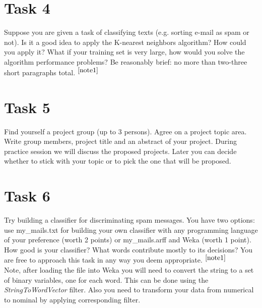 \documentclass{article}
\newcommand{\footref}[1]{%
    $^{\ref{#1}}$%
}
\begin{document}
\section*{Task 4}
Suppose you are given a task of classifying texts (e.g. sorting e-mail as spam or not). Is it a good idea to apply the K-nearest neighbors algorithm? How could you apply it? What if your training set is very large, how would you solve the algorithm performance problems?
Be reasonably brief: no more than two-three short paragraphs total.\footref{note1}

\section*{Task 5}
Find yourself a project group (up to 3 persons). Agree on a project topic area. Write group members, project title and an abstract of your project. During practice session we will discuss the proposed projects. Later you can decide whether to stick with your topic or to pick the one that will be proposed. 


\section*{Task 6}
Try building a classifier for discriminating spam messages. You have two options: use my\_mails.txt for building your own classifier with any programming language of your preference (worth 2 points) or my\_mails.arff and Weka (worth 1 point). How good is your classifier? What words contribute mostly to its decisions? You are free to approach this task in any way you deem appropriate.\footref{note1}\\

Note, after loading the file into Weka you will need to convert the string to a set of binary variables, one for each word. This can be done using the \emph{StringToWordVector} filter. Also you need to transform your data from numerical to nominal by applying corresponding filter. 
\end{document}
